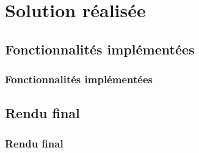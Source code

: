 \section{Solution r\'ealis\'ee}

\subsection{Fonctionnalit\'es impl\'ement\'ees}
\frame
{
\frametitle{Fonctionnalit\'es impl\'ement\'ees}


}

\subsection{Rendu final}
\frame
{
\frametitle{Rendu final}


}
